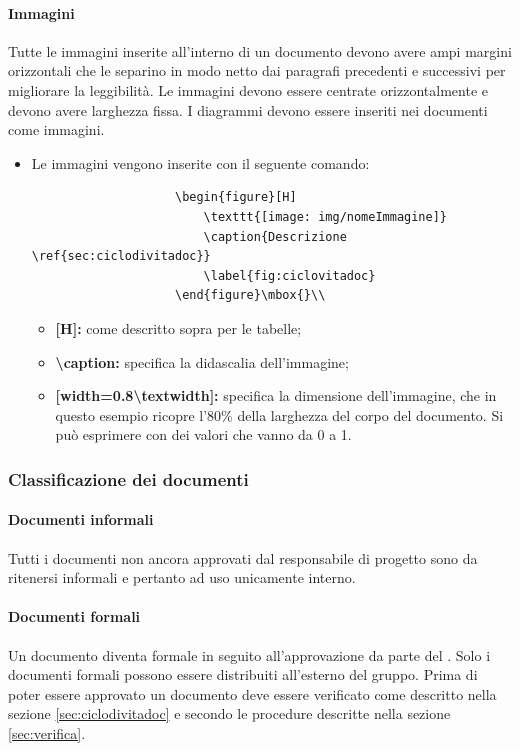                 \paragraph{Immagini}
                Tutte le immagini inserite all'interno di un documento devono avere ampi margini orizzontali che le separino in modo netto dai paragrafi precedenti e successivi per migliorare la leggibilità. Le immagini devono essere centrate orizzontalmente e devono avere larghezza fissa. I diagrammi  devono essere inseriti nei documenti come immagini.
                \begin{itemize}
                	\item Le immagini vengono inserite con il seguente comando:
                	\begin{verbatim}
					\begin{figure}[H]
						\texttt{[image: img/nomeImmagine]}
						\caption{Descrizione \ref{sec:ciclodivitadoc}}
						\label{fig:ciclovitadoc}
					\end{figure}\mbox{}\\
                	\end{verbatim}
                		\begin{itemize}
                		\item \textbf{[H]:} come descritto sopra per le tabelle;
                		\item \textbf{\textbackslash caption:} specifica la didascalia dell'immagine;
                		\item \textbf{[width=0.8\textbackslash textwidth]:} specifica la dimensione dell'immagine, che in questo esempio ricopre l'80\% della larghezza del corpo del documento. Si può esprimere con dei valori che vanno da 0 a 1. 
                	\end{itemize} 
                 \end{itemize}
        \subsubsection{Classificazione dei documenti}\label{sec:classDoc}
            \paragraph{Documenti informali}
            Tutti i documenti non ancora approvati dal responsabile di progetto sono da ritenersi informali e pertanto ad uso unicamente interno.
            \paragraph{Documenti formali}
            Un documento diventa formale in seguito all'approvazione da parte del \responsabilediprogetto. Solo i documenti formali possono essere distribuiti all'esterno del gruppo. Prima di poter essere approvato un documento deve essere verificato come descritto nella sezione \ref{sec:ciclodivitadoc} e secondo le procedure descritte nella sezione \ref{sec:verifica}.
